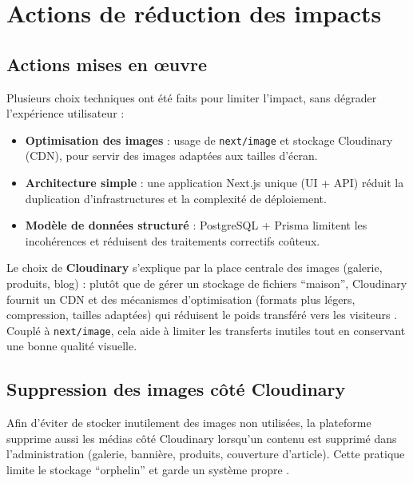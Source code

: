 \section{Actions de réduction des impacts}

\subsection{Actions mises en œuvre}
Plusieurs choix techniques ont été faits pour limiter l’impact, sans dégrader l’expérience utilisateur :
\begin{itemize}
    \item \textbf{Optimisation des images} : usage de \texttt{next/image} et stockage Cloudinary (CDN), pour servir des images adaptées aux tailles d’écran.
    \item \textbf{Architecture simple} : une application Next.js unique (UI + API) réduit la duplication d’infrastructures et la complexité de déploiement.
    \item \textbf{Modèle de données structuré} : PostgreSQL + Prisma limitent les incohérences et réduisent des traitements correctifs coûteux.
\end{itemize}

\noindent Le choix de \textbf{Cloudinary} s’explique par la place centrale des images (galerie, produits, blog) : plutôt que de gérer un stockage de fichiers “maison”, Cloudinary fournit un CDN et des mécanismes d’optimisation (formats plus légers, compression, tailles adaptées) qui réduisent le poids transféré vers les visiteurs \cite{cloudinaryDocs}. Couplé à \texttt{next/image}, cela aide à limiter les transferts inutiles tout en conservant une bonne qualité visuelle.

\subsection{Suppression des images côté Cloudinary}
Afin d’éviter de stocker inutilement des images non utilisées, la plateforme supprime aussi les médias côté Cloudinary lorsqu’un contenu est supprimé dans l’administration (galerie, bannière, produits, couverture d’article). Cette pratique limite le stockage “orphelin” et garde un système propre \cite{cloudinaryDocs}.